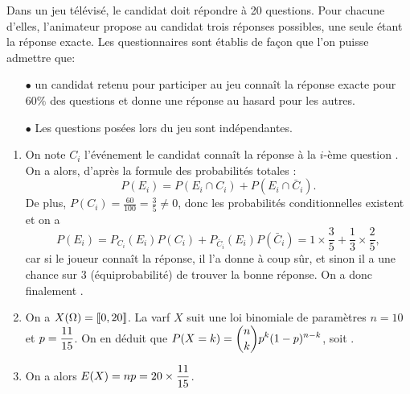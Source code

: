 \documentclass[a4paper, 11pt,reqno]{article}
\begin{document}
\begin{correction}  \;
	Dans un jeu t\'el\'evis\'e, le candidat doit r\'epondre \`a 20 questions. Pour chacune d'elles, l'animateur propose au candidat trois r\'eponses possibles, une seule \'etant la r\'eponse exacte. Les questionnaires sont \'etablis de fa\c{c}on que l'on puisse admettre que:
	\begin{itemize}
		\item[$\bullet$] un candidat retenu pour participer au jeu conna\^it la r\'eponse exacte pour $60\%$ des questions et donne une r\'eponse au hasard pour les autres.
		\item[$\bullet$]  Les questions pos\'ees lors du jeu sont ind\'ependantes.
	\end{itemize}
	\begin{enumerate}
		\item On note $C_i$ l'\'ev\'enement \og le candidat conna\^it la r\'eponse \`a la $i$-\`eme question \fg. On a alors, d'apr\`es la formule des probabilit\'es totales :
		      $$P(E_i)  = P(E_i \cap C_i) + P(E_i \cap \bar C_i).$$
		      De plus, $P(C_i) = \frac{60}{100}=\frac{3}{5}\not=0$, donc les probabilit\'es conditionnelles existent et on a
		      $$P(E_i) = P_{C_i}(E_i) P(C_i) + P_{\bar C_i}(E_i) P(\bar C_i) = 1 \times \frac{3}{5} + \frac{1}{3} \times \frac{2}{5},$$
		      car si le joueur conna\^it la r\'eponse, il l'a donne \`a coup s\^ur, et sinon il a une chance sur $3$ (\'equiprobabilit\'e) de trouver la bonne r\'eponse. On a donc finalement .
		\item On a $X(\Omega) = \llbracket  0, 20 \rrbracket$. La varf $X$ suit une loi binomiale de param\`etres $n=10$ et $\displaystyle p= \frac{11}{15}$. On en d\'eduit que $\displaystyle P(X=k) = \binom{n}{k} p^k (1-p)^{n-k}$, soit .
		\item On a alors $\displaystyle E(X) = n p = 20 \times \frac{11}{15}$.
	\end{enumerate}
\end{correction}
\end{document}
